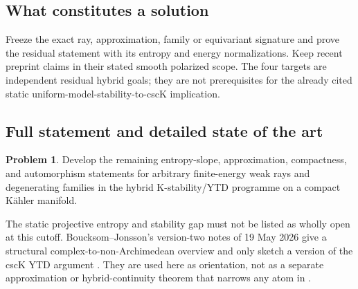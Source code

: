 \documentclass[11pt,a4paper]{article}
\theoremstyle{definition}
\newtheorem{problem}{Problem}[section]
\theoremstyle{remark}
\begin{document}
\subsection{What constitutes a solution}
Freeze the exact ray, approximation, family or equivariant signature and prove the residual statement with its entropy and energy normalizations. Keep recent preprint claims in their stated smooth polarized scope. The four targets are independent residual hybrid goals; they are not prerequisites for the already cited static uniform-model-stability-to-cscK implication.

\subsection{Full statement and detailed state of the art}
\label{sec:ch72-hybrid-ytd}

\begin{problem}\label{prob:frontier-hybrid-ytd}
Develop the remaining entropy-slope, approximation, compactness, and
automorphism statements for arbitrary finite-energy weak rays and
degenerating families in the hybrid K-stability/YTD programme on a compact
Kähler manifold.
\end{problem}

The static projective entropy and stability gap must not be listed as wholly
open at this cutoff.  Boucksom--Jonsson's version-two notes of 19 May 2026
give a structural complex-to-non-Archimedean overview and only sketch a
version of the cscK YTD argument \cite{BJ26ComplexNA}.  They are used here
as orientation, not as a separate approximation or hybrid-continuity theorem
that narrows any atom in .
\end{document}
